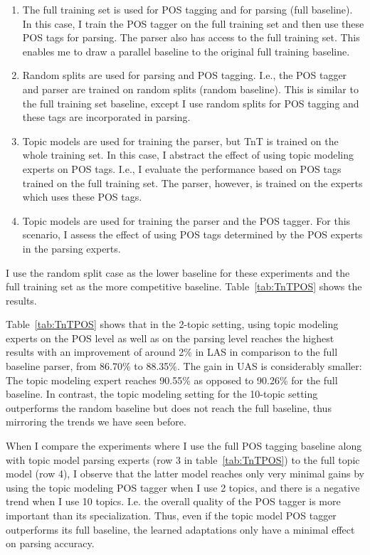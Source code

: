 \begin{enumerate}
	\item The full training set is used for POS tagging and for parsing (full baseline). In this case, I train the POS tagger on the full training set and then use these POS tags for parsing. The parser also has access to the full training set. This enables me to draw a parallel baseline to the original full training baseline.
	\item Random splits are used for parsing and POS tagging. I.e., the POS tagger and parser are trained on random splits (random baseline). This is similar to the full training set baseline, except I use random splits for POS tagging and these tags are incorporated in parsing. 
	\item Topic models are used for training the parser, but TnT is trained on the whole training set. In this case, I abstract the effect of using topic modeling experts on POS tags. I.e., I evaluate the performance based on POS tags trained on the full training set. The parser, however, is trained on the experts which uses these POS tags.
	\label{S2}
	\item Topic models are used for training the parser and the POS tagger. For this scenario, I assess the effect of using POS tags determined by the POS experts in the parsing experts. \label{S1}
\end{enumerate}

I use the random split case as the lower baseline for these experiments and the full training set as the more competitive baseline. Table~\ref{tab:TnTPOS} shows the results.


Table~\ref{tab:TnTPOS}  shows that in the 2-topic setting, using topic modeling experts on the POS level as well as on the parsing level reaches the highest results with an improvement of around 2\% in LAS in comparison to the full baseline parser, from 86.70\% to 88.35\%. The gain in UAS is considerably smaller: The topic modeling expert reaches 90.55\% as opposed to 90.26\% for the full baseline. In contrast, the topic modeling setting for the 10-topic setting outperforms the random baseline but does not reach the full baseline,  thus mirroring the trends we have seen before.



When I compare the experiments where I use the full POS tagging baseline along with topic model parsing experts (row 3 in table~\ref{tab:TnTPOS}) to the full topic model (row 4), I observe that the latter model reaches only very minimal gains by using the topic modeling POS tagger when I use 2 topics, and there is a negative trend when I use 10 topics. I.e. the overall quality of the POS tagger is more important than its specialization. Thus, even if the topic model POS tagger outperforms its full baseline, the learned adaptations only have a minimal effect on parsing accuracy.

